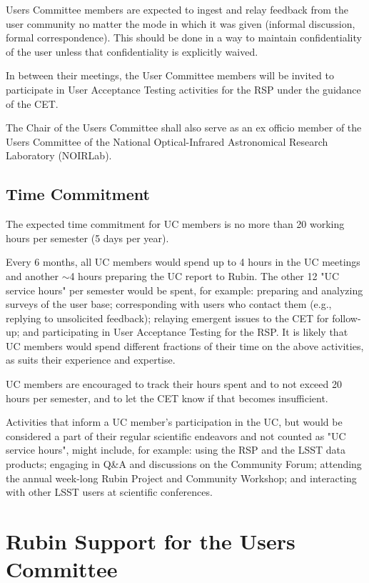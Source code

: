 \documentclass[OPS,toc]{lsstdoc}
\begin{document}
Users Committee members are expected to ingest and relay feedback from the user community no matter the mode in which it was given (informal discussion, formal correspondence).
This should be done in a way to maintain confidentiality of the user unless that confidentiality is explicitly waived. 

In between their meetings, the User Committee members will be invited to participate in User Acceptance Testing activities for the RSP under the guidance of the CET.  

The Chair of the Users Committee shall also serve as an ex officio member of the Users Committee of the National Optical-Infrared Astronomical Research Laboratory (NOIRLab). 

\subsection{Time Commitment}

The expected time commitment for UC members is no more than 20 working hours per semester (5 days per year).

Every 6 months, all UC members would spend up to 4 hours in the UC meetings and another $\sim$4 hours preparing the UC report to Rubin.
The other 12 "UC service hours" per semester would be spent, for example: preparing and analyzing surveys of the user base; corresponding with users who contact them (e.g., replying to unsolicited feedback); relaying emergent issues to the CET for follow-up; and participating in User Acceptance Testing for the RSP. 
It is likely that UC members would spend different fractions of their time on the above activities, as suits their experience and expertise.

UC members are encouraged to track their hours spent and to not exceed 20 hours per semester, and to let the CET know if that becomes insufficient. 

Activities that inform a UC member's participation in the UC, but would be considered a part of their regular scientific endeavors and not counted as "UC service hours", might include, for example: using the RSP and the LSST data products; engaging in Q\&A and discussions on the Community Forum; attending the annual week-long Rubin Project and Community Workshop; and interacting with other LSST users at scientific conferences.

\section{Rubin Support for the Users Committee}
\end{document}
